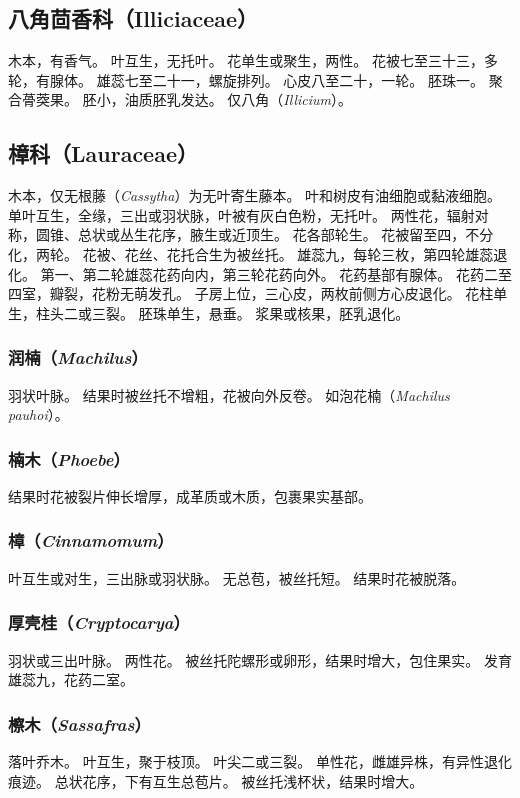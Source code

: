 \documentclass[11pt]{article}
\begin{document}
\begin{sloppypar}
\subsection{八角茴香科（Illiciaceae）}
木本，有香气。
叶互生，无托叶。
花单生或聚生，两性。
花被七至三十三，多轮，有腺体。
雄蕊七至二十一，螺旋排列。
心皮八至二十，一轮。
胚珠一。
聚合蓇葖果。
胚小，油质胚乳发达。
仅八角（\textit{Illicium}）。

\subsection{樟科（Lauraceae）}
木本，仅无根藤（\textit{Cassytha}）为无叶寄生藤本。
叶和树皮有油细胞或黏液细胞。
单叶互生，全缘，三出或羽状脉，叶被有灰白色粉，无托叶。
两性花，辐射对称，圆锥、总状或丛生花序，腋生或近顶生。
花各部轮生。
花被留至四，不分化，两轮。
花被、花丝、花托合生为被丝托。
雄蕊九，每轮三枚，第四轮雄蕊退化。
第一、第二轮雄蕊花药向内，第三轮花药向外。
花药基部有腺体。
花药二至四室，瓣裂，花粉无萌发孔。
子房上位，三心皮，两枚前侧方心皮退化。
花柱单生，柱头二或三裂。
胚珠单生，悬垂。
浆果或核果，胚乳退化。

\subsubsection{润楠（\textit{Machilus}）}
羽状叶脉。
结果时被丝托不增粗，花被向外反卷。
如泡花楠（\textit{Machilus pauhoi}）。

\subsubsection{楠木（\textit{Phoebe}）}
结果时花被裂片伸长增厚，成革质或木质，包裹果实基部。

\subsubsection{樟（\textit{Cinnamomum}）}
叶互生或对生，三出脉或羽状脉。
无总苞，被丝托短。
结果时花被脱落。

\subsubsection{厚壳桂（\textit{Cryptocarya}）}
羽状或三出叶脉。
两性花。
被丝托陀螺形或卵形，结果时增大，包住果实。
发育雄蕊九，花药二室。

\subsubsection{檫木（\textit{Sassafras}）}
落叶乔木。
叶互生，聚于枝顶。
叶尖二或三裂。
单性花，雌雄异株，有异性退化痕迹。
总状花序，下有互生总苞片。
被丝托浅杯状，结果时增大。


\end{sloppypar}
\end{document}
